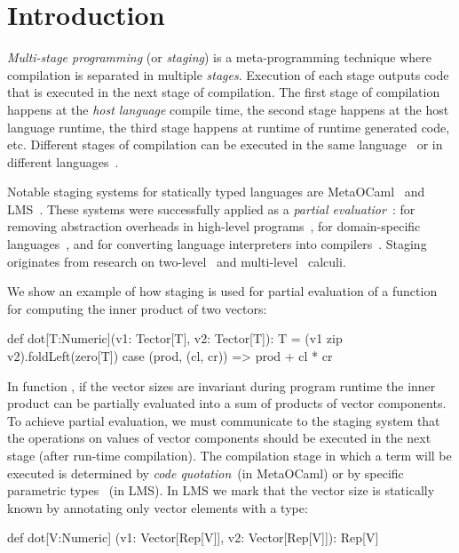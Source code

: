 \section{Introduction}
\label{sct:introduction}

 \emph{Multi-stage programming} (or \emph{staging}) is a meta-programming technique
  where compilation is separated in multiple \emph{stages}. Execution of each
  stage outputs code that is executed in the next stage of compilation. The first
  stage of compilation happens at the \emph{host language} compile time, the second
  stage happens at the host language runtime, the third stage happens at runtime of
  runtime generated code, etc. Different stages of compilation can be executed in the same
  language~\cite{taha_multi-stage_1997,nielson2005two} or in different languages~\cite{brown_heterogeneous_2011,devito2013terra}.

  Notable staging systems for statically typed languages are
  MetaOCaml~\cite{taha_multi-stage_1997,calcagno2003implementing}
  and LMS~\cite{rompf2012lightweight}. These systems were successfully applied as a
  \emph{partial evaluatior}~\cite{jones1993partial}: for removing abstraction
  overheads in high-level programs~\cite{carette2005multi,rompf2012lightweight},
  for domain-specific languages~\cite{czarnecki_dsl_2004,jonnalagedda2014staged,taha2004gentle}, and for converting language
  interpreters into compilers~\cite{lancet,futamura1999partial}. Staging originates
  from research on two-level~\cite{nielson2005two,davies1996temporal} and multi-level~\cite{davies1996modal} calculi.

 We show an example of how staging is used for partial evaluation of a function
 for computing the inner product of two vectors\footnotemark[1]:\begin{lstparagraph}
def dot[T:Numeric](v1: Tector[T], v2: Tector[T]): T =
  (v1 zip v2).foldLeft(zero[T]) {
    case (prod, (cl, cr)) => prod + cl * cr
  }
 \end{lstparagraph}

In function , if the vector sizes are invariant during program runtime the inner product can
 be partially evaluated into a sum of products of vector components. To achieve partial evaluation,
 we must communicate to the staging system that the operations on values of vector components
 should be executed in the next stage (after run-time compilation). The compilation stage
 in which a term will be executed is determined by \emph{code quotation}~(in MetaOCaml)
 or by specific parametric types ~(in LMS). In LMS we mark
 that the vector size is statically known by annotating only vector elements with
 a  type\footnotemark[2]:\begin{lstparagraph}
def dot[V:Numeric]
  (v1: Vector[Rep[V]], v2: Vector[Rep[V]]): Rep[V]
 \end{lstparagraph}

